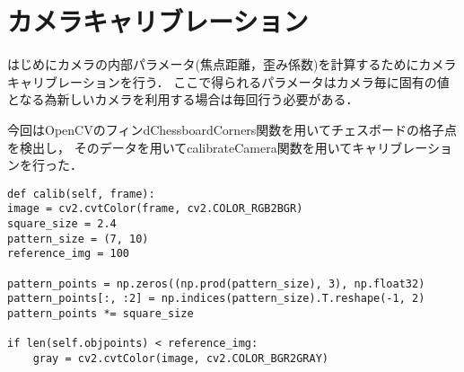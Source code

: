 \section{カメラキャリブレーション}
\label{calib}

はじめにカメラの内部パラメータ(焦点距離，歪み係数)を計算するためにカメラキャリブレーションを行う．
ここで得られるパラメータはカメラ毎に固有の値となる為新しいカメラを利用する場合は毎回行う必要がある．

今回はOpenCVのフィンdChessboardCorners関数を用いてチェスボードの格子点を検出し，
そのデータを用いてcalibrateCamera関数を用いてキャリブレーションを行った．

\begin{lstlisting}[caption=calibration code,label=calib_code]
def calib(self, frame):                                                                                                                                      
image = cv2.cvtColor(frame, cv2.COLOR_RGB2BGR)                                                                                                           
square_size = 2.4                                                                                                                                        
pattern_size = (7, 10)                                                                                                                                   
reference_img = 100                                                                                                                                      
                                                                                                                                                         
pattern_points = np.zeros((np.prod(pattern_size), 3), np.float32)                                                                                        
pattern_points[:, :2] = np.indices(pattern_size).T.reshape(-1, 2)                                                                                        
pattern_points *= square_size                                                                                                                            
                                                                                                                                                         
if len(self.objpoints) < reference_img:                                                                                                                  
    gray = cv2.cvtColor(image, cv2.COLOR_BGR2GRAY)                                                                                                       
                                                                                                                                                         

\end{lstlisting}
